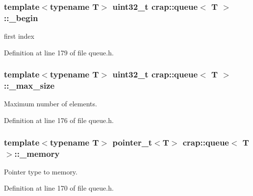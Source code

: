 \subsubsection[{\+\_\+begin}]{\setlength{\rightskip}{0pt plus 5cm}template$<$typename T$>$ uint32\+\_\+t {\bf crap\+::queue}$<$ T $>$\+::\+\_\+begin\hspace{0.3cm}{\ttfamily [protected]}}\label{classcrap_1_1queue_a754dd42464cea488ad629109dfd8933f}


first index 



Definition at line 179 of file queue.\+h.

\hypertarget{classcrap_1_1queue_a01314cde8e1d28f2f8d5d347f3ce94a8}{}
\subsubsection[{\+\_\+max\+\_\+size}]{\setlength{\rightskip}{0pt plus 5cm}template$<$typename T$>$ uint32\+\_\+t {\bf crap\+::queue}$<$ T $>$\+::\+\_\+max\+\_\+size\hspace{0.3cm}{\ttfamily [protected]}}\label{classcrap_1_1queue_a01314cde8e1d28f2f8d5d347f3ce94a8}


Maximum number of elements. 



Definition at line 176 of file queue.\+h.

\hypertarget{classcrap_1_1queue_aaa7768109ef5518469358b6963282c8d}{}
\subsubsection[{\+\_\+memory}]{\setlength{\rightskip}{0pt plus 5cm}template$<$typename T$>$ {\bf pointer\+\_\+t}$<$T$>$ {\bf crap\+::queue}$<$ T $>$\+::\+\_\+memory\hspace{0.3cm}{\ttfamily [protected]}}\label{classcrap_1_1queue_aaa7768109ef5518469358b6963282c8d}


Pointer type to memory. 



Definition at line 170 of file queue.\+h.

\hypertarget{classcrap_1_1queue_a6025cd210773605e1b78d9136c020409}{}
